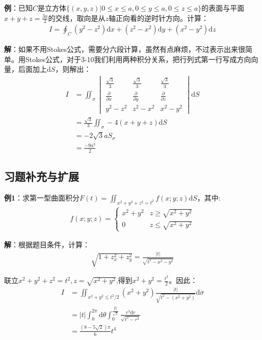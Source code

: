 \documentclass{ctexart}
\let\oldtextbf\textbf
\renewcommand{\textbf}[1]{\textcolor{brown!50!red}{\oldtextbf{#1}}}
\begin{document}
\textbf{\color{brown!50!red}例}：已知$C$是立方体$\{(x,y,z)|0\leq x\leq a,0\leq y\leq a,0\leq z\leq a\}$的表面与平面$x+y+z=\frac{3a}{2}$的交线，取向是从$z$轴正向看的逆时针方向。计算：
\begin{align*} 
 I=\oint_C(y^2-z^2)\mathrm{d}x+(z^2-x^2)\mathrm{d}y+(x^2-y^2)\mathrm{d}z     
\end{align*}

\textbf{\color{brown!50!red}解}：如果不用Stokes公式，需要分六段计算，虽然有点麻烦，不过表示出来很简单。用Stokes公式，对于3-10我们利用两种积分关系，把行列式第一行写成方向向量，后面加上$\mathrm{d}S$，则解出：
\begin{align*} 
 I&=\iint_\sigma \begin{vmatrix}
 \frac{\sqrt{3} }{3}  & \frac{\sqrt{3} }{3} & \frac{\sqrt{3} }{3}\\
\frac{\partial }{\partial  x}  & \frac{\partial }{\partial  y}  & \frac{\partial }{\partial  z}\\
y^2-z^2  & z^2-x^2 &x^2-y^2
\end{vmatrix}   \mathrm{d}S \\
&=\frac{\sqrt{3} }{3}\iint_\sigma -4(x+y+z)\mathrm{d}S\\
&=-2\sqrt{3}aS_\sigma\\
&=\frac{-9a^3}{2}   
\end{align*}
\subsection{习题补充与扩展}
\textbf{\color{brown!50!red}例1}：求第一型曲面积分$F(t)=\iint_{x^2+y^2+z^2=t^2}f(x;y;z)\mathrm{d}S$，其中:
\begin{align*}
    f(x;y;z)=\begin{cases}
         x^2+y^2 & z\geq\sqrt{x^2+y^2}\\
         0 & z\leq\sqrt{x^2+y^2}
    \end{cases}
\end{align*}

\textbf{\color{brown!50!red}解}：根据题目条件，计算：
\begin{align*} 
  \sqrt{1+z_x^2+z_y^2}=\frac{|t|}{\sqrt{t^2-x^2-y^2}}  
\end{align*}

联立$x^2+y^2+z^2=t^2,z=\sqrt{x^2+y^2}$,得到$x^2+y^2=\frac{t^2}{2}$。因此：
\begin{align*} 
 I&=\iint_{x^2+y^2\leq t^2/2}(x^2+y^2)\frac{|t|}{\sqrt{t^2-(x^2+y^2)} }\mathrm{d}\sigma\\
&=|t|\int_0^{2\pi}\mathrm{d}\theta\int_0^{\frac{|t|}{\sqrt{2}}}\frac{r^3\mathrm{d}r }{\sqrt{t^2-r^2}} \\
&=\frac{(8-5\sqrt{2})\pi}{6} t^4 
\end{align*}
\end{document}
